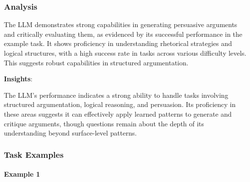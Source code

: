 \documentclass[fleqn,10pt]{wlscirep}
\begin{document}
\hypertarget{analysis-14}{%
\subsubsection{Analysis}\label{analysis-14}}

The LLM demonstrates strong capabilities in generating persuasive
arguments and critically evaluating them, as evidenced by its successful
performance in the example task. It shows proficiency in understanding
rhetorical strategies and logical structures, with a high success rate
in tasks across various difficulty levels. This suggests robust
capabilities in structured argumentation.

\textbf{Insights}:

The LLM's performance indicates a strong ability to handle tasks
involving structured argumentation, logical reasoning, and persuasion.
Its proficiency in these areas suggests it can effectively apply learned
patterns to generate and critique arguments, though questions remain
about the depth of its understanding beyond surface-level patterns.

\hypertarget{task-examples-14}{%
\subsubsection{Task Examples}\label{task-examples-14}}

\hypertarget{example-1-14}{%
\paragraph{Example 1}\label{example-1-14}}
\end{document}
